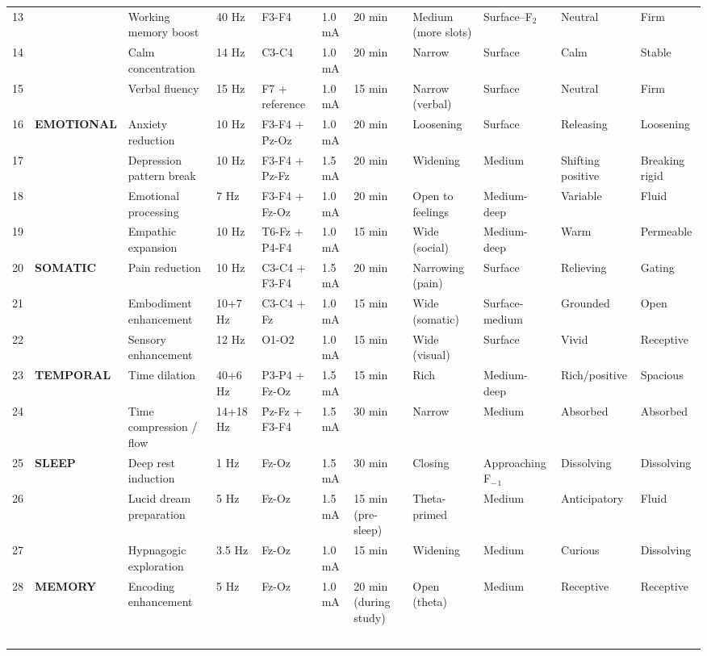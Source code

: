 \begin{longtable}{p{} p{} p{} p{} p{} p{} p{} p{} p{} p{} p{}}
13 &  & Working memory boost & 40 Hz & F3-F4 & 1.0 mA & 20 min & Medium (more slots) & Surface–F$_2$ & Neutral & Firm \\
14 &  & Calm concentration & 14 Hz & C3-C4 & 1.0 mA & 20 min & Narrow & Surface & Calm & Stable \\
15 &  & Verbal fluency & 15 Hz & F7 + reference & 1.0 mA & 15 min & Narrow (verbal) & Surface & Neutral & Firm \\
16 & \textbf{EMOTIONAL} & Anxiety reduction & 10 Hz & F3-F4 + Pz-Oz & 1.0 mA & 20 min & Loosening & Surface & Releasing & Loosening \\
17 &  & Depression pattern break & 10 Hz & F3-F4 + Pz-Fz & 1.5 mA & 20 min & Widening & Medium & Shifting positive & Breaking rigid \\
18 &  & Emotional processing & 7 Hz & F3-F4 + Fz-Oz & 1.0 mA & 20 min & Open to feelings & Medium-deep & Variable & Fluid \\
19 &  & Empathic expansion & 10 Hz & T6-Fz + P4-F4 & 1.0 mA & 15 min & Wide (social) & Medium-deep & Warm & Permeable \\
20 & \textbf{SOMATIC} & Pain reduction & 10 Hz & C3-C4 + F3-F4 & 1.5 mA & 20 min & Narrowing (pain) & Surface & Relieving & Gating \\
21 &  & Embodiment enhancement & 10+7 Hz & C3-C4 + Fz & 1.0 mA & 15 min & Wide (somatic) & Surface-medium & Grounded & Open \\
22 &  & Sensory enhancement & 12 Hz & O1-O2 & 1.0 mA & 15 min & Wide (visual) & Surface & Vivid & Receptive \\
23 & \textbf{TEMPORAL} & Time dilation & 40+6 Hz & P3-P4 + Fz-Oz & 1.5 mA & 15 min & Rich & Medium-deep & Rich/positive & Spacious \\
24 &  & Time compression / flow & 14+18 Hz & Pz-Fz + F3-F4 & 1.5 mA & 30 min & Narrow & Medium & Absorbed & Absorbed \\
25 & \textbf{SLEEP} & Deep rest induction & 1 Hz & Fz-Oz & 1.5 mA & 30 min & Closing & Approaching F$_{-}$$_1$ & Dissolving & Dissolving \\
26 &  & Lucid dream preparation & 5 Hz & Fz-Oz & 1.5 mA & 15 min (pre-sleep) & Theta-primed & Medium & Anticipatory & Fluid \\
27 &  & Hypnagogic exploration & 3.5 Hz & Fz-Oz & 1.0 mA & 15 min & Widening & Medium & Curious & Dissolving \\
28 & \textbf{MEMORY} & Encoding enhancement & 5 Hz & Fz-Oz & 1.0 mA & 20 min (during study) & Open (theta) & Medium & Receptive & Receptive \\
$$
\end{longtable}
